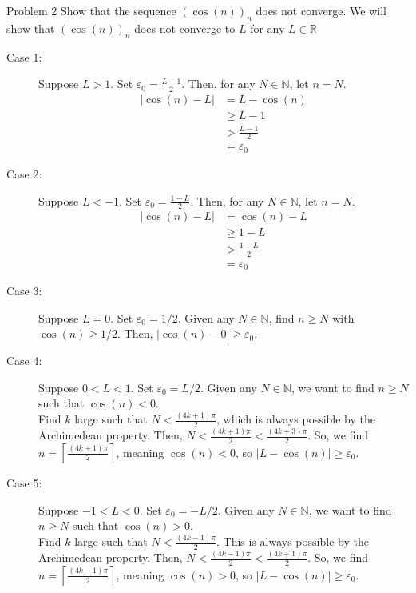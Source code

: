 \documentclass[10pt]{extarticle}
\newcommand{\N}{\mathbb{N}}
\newcommand{\R}{\mathbb{R}}
\begin{document}
  \begin{problem}{Problem 2}
    Show that the sequence $(\cos(n))_n$ does not converge.
    \tcblower
    We will show that $(\cos(n))_n$ does not converge to $L$ for any $L \in\R$
    \begin{description}
      \item[Case 1:] Suppose $L > 1$. Set $\varepsilon_0 = \frac{L-1}{2}$. Then, for any $N\in\N$, let $n = N$.
        \begin{align*}
          |\cos(n) - L| &= L - \cos(n)\\
                        &\geq L-1\\
                        &> \frac{L-1}{2}\\
                        &= \varepsilon_0
        \end{align*}
      \item[Case 2:] Suppose $L < -1$. Set $\varepsilon_0 = \frac{1-L}{2}$. Then, for any $N\in\N$, let $n = N$.
        \begin{align*}
          |\cos(n) - L| &= \cos(n) - L\\
                        &\geq 1 - L\\
                        &> \frac{1-L}{2}\\
                        &=\varepsilon_0
        \end{align*}
      \item[Case 3:] Suppose $L = 0$. Set $\varepsilon_0 = 1/2$. Given any $N\in\N$, find $n \geq N$ with $\cos(n) \geq 1/2$. Then, $|\cos(n) - 0| \geq \varepsilon_0$.
      \item[Case 4:] Suppose $0 < L < 1$. Set $\varepsilon_0 = L/2$. Given any $N\in\N$, we want to find $n\geq N$ such that $\cos(n) < 0$.\\

        Find $k$ large such that $N < \frac{(4k+1)\pi}{2}$, which is always possible by the Archimedean property. Then, $N < \frac{(4k+1)\pi}{2} < \frac{(4k+3)\pi}{2}$. So, we find $n = \left\lceil \frac{(4k+1)\pi}{2}\right\rceil$, meaning $\cos(n) < 0$, so $|L - \cos(n)| \geq \varepsilon_0$.
      \item[Case 5:] Suppose $-1 < L < 0$. Set $\varepsilon_0 = -L/2$. Given any $N\in\N$, we want to find $n\geq N$ such that $\cos(n) > 0$.\\

        Find $k$ large such that $N < \frac{(4k-1)\pi}{2}$. This is always possible by the Archimedean property. Then, $N < \frac{(4k-1)\pi}{2} < \frac{(4k+1)\pi}{2}$. So, we find $n = \left\lceil \frac{(4k-1)\pi}{2}\right\rceil$, meaning $\cos(n) > 0$, so $|L-\cos(n)| \geq \varepsilon_0$.
    \end{description}
  \end{problem}
\end{document}
